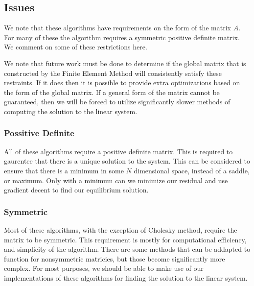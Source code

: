 \documentclass[../fem.tex]{subfiles}
\begin{document}
\begin{Figure}
   \begin{center}
     
   \end{center}
\end{Figure}

\subsection{Issues}%
\label{sub:issues}

We note that these algorithms have requirements on the form of the matrix $A$.
For many of these the algorithm requires a symmetric positive definite matrix.
We comment on some of these restrictions here.

We note that future work must be done to determine if the global matrix that is
constructed by the Finite Element Method will consistently satisfy these
restraints. If it does then it is possible to provide extra optimizations based
on the form of the global matrix. If a general form of the matrix cannot be
guaranteed, then we will be forced to utilize significantly slower methods of
computing the solution to the linear system.

\subsubsection{Possitive Definite}%
\label{ssub:possitive_definite}

All of these algorithms require a positive definite matrix. This is required to
gaurentee that there is a unique solution to the system. This can be considered
to ensure that there is a minimum in some $N$ dimensional space, instead of a
saddle, or maximum. Only with a minimum can we minimize our residual and use
gradient decent to find our equilibrium solution.

\subsubsection{Symmetric}%
\label{ssub:symmetric}

Most of these algorithms, with the exception of Cholesky method, require the
matrix to be symmetric. This requirement is mostly for computational
efficiency, and simplicity of the algorithm. There are some methods that can be
addapted to function for nonsymmetric matricies, but those become significantly
more complex. For most purposes, we should be able to make use of our
implementations of these algorithms for finding the solution to the linear
system.
\end{document}
